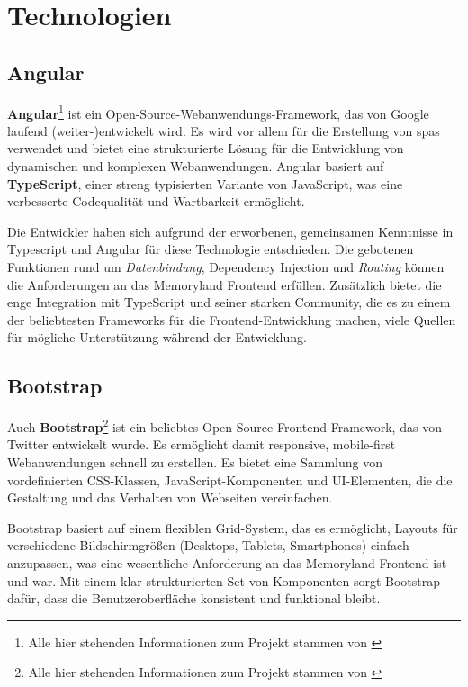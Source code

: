 
\section{Technologien}

\subsection{Angular}

\textbf{Angular}\footnote{Alle hier stehenden Informationen zum Projekt stammen von \cite{Angular}} ist ein Open-Source-Webanwendungs-Framework, das von Google laufend (weiter-)entwickelt wird. Es wird vor allem für die Erstellung von \Glspl{spa} verwendet und bietet eine strukturierte Lösung für die Entwicklung von dynamischen und komplexen Webanwendungen. Angular basiert auf \textbf{TypeScript}, einer streng typisierten Variante von JavaScript, was eine verbesserte Codequalität und Wartbarkeit ermöglicht.

Die Entwickler haben sich aufgrund der erworbenen, gemeinsamen Kenntnisse in Typescript und Angular für diese Technologie entschieden. Die gebotenen Funktionen rund um \emph{Datenbindung}, Dependency Injection und \emph{Routing} können die Anforderungen an das Memoryland Frontend erfüllen. Zusätzlich bietet die enge Integration mit TypeScript und seiner starken Community, die es zu einem der beliebtesten Frameworks für die Frontend-Entwicklung machen, viele Quellen für mögliche Unterstützung während der Entwicklung.


\subsection{Bootstrap}

Auch \textbf{Bootstrap}\footnote{Alle hier stehenden Informationen zum Projekt stammen von \cite{Bootstrap}}  ist ein beliebtes Open-Source Frontend-Framework, das von Twitter entwickelt wurde. Es ermöglicht damit responsive, mobile-first Webanwendungen schnell zu erstellen. Es bietet eine Sammlung von vordefinierten CSS-Klassen, JavaScript-Komponenten und UI-Elementen, die die Gestaltung und das Verhalten von Webseiten vereinfachen. 

Bootstrap basiert auf einem flexiblen Grid-System, das es ermöglicht, Layouts für verschiedene Bildschirmgrö\ss{}en (Desktops, Tablets, Smartphones) einfach anzupassen, was eine wesentliche Anforderung an das Memoryland Frontend ist und war. Mit einem klar strukturierten Set von Komponenten sorgt Bootstrap dafür, dass die Benutzeroberfläche konsistent und funktional bleibt.

